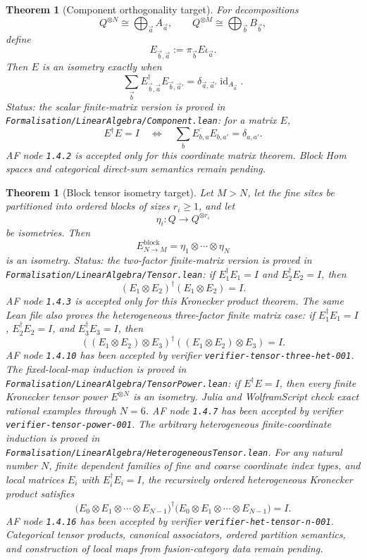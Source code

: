 \documentclass[11pt]{article}
\newtheorem{theorem}[definition]{Theorem}
\begin{document}
\begin{theorem}[Component orthogonality target]
For decompositions
\[
Q^{\otimes N}\cong \bigoplus_{\vec a}A_{\vec a},
\qquad
Q^{\otimes M}\cong \bigoplus_{\vec b}B_{\vec b},
\]
define
\[
E_{\vec b,\vec a}:=\pi_{\vec b}E\iota_{\vec a}.
\]
Then \(E\) is an isometry exactly when
\[
\sum_{\vec b}E_{\vec b,\vec a}^{\dagger}E_{\vec b,\vec a'}
=\delta_{\vec a,\vec a'}\operatorname{id}_{A_{\vec a}}.
\]
Status: the scalar finite-matrix version is proved in
\texttt{Formalisation/LinearAlgebra/Component.lean}: for a matrix \(E\),
\[
E^\dagger E=I
\quad\Longleftrightarrow\quad
\sum_b \overline{E_{b,a}}E_{b,a'}=\delta_{a,a'}.
\]
AF node \texttt{1.4.2} is accepted only for this coordinate matrix theorem.
Block Hom spaces and categorical direct-sum semantics remain pending.
\end{theorem}

\begin{theorem}[Block tensor isometry target]
Let \(M>N\), let the fine sites be partitioned into ordered blocks of sizes
\(r_i\geq 1\), and let
\[
\eta_i:Q\to Q^{\otimes r_i}
\]
be isometries. Then
\[
E_{N\to M}^{\mathrm{block}}=\eta_1\otimes\cdots\otimes\eta_N
\]
is an isometry. Status: the two-factor finite-matrix version is proved in
\texttt{Formalisation/LinearAlgebra/Tensor.lean}: if \(E_1^\dagger E_1=I\)
and \(E_2^\dagger E_2=I\), then
\[
(E_1\otimes E_2)^\dagger(E_1\otimes E_2)=I.
\]
AF node \texttt{1.4.3} is accepted only for this Kronecker product theorem.
The same Lean file also proves the heterogeneous three-factor finite matrix
case: if \(E_1^\dagger E_1=I\), \(E_2^\dagger E_2=I\), and
\(E_3^\dagger E_3=I\), then
\[
((E_1\otimes E_2)\otimes E_3)^\dagger
((E_1\otimes E_2)\otimes E_3)=I.
\]
AF node \texttt{1.4.10} has been accepted by verifier
\texttt{verifier-tensor-three-het-001}.
The fixed-local-map induction is proved in
\texttt{Formalisation/LinearAlgebra/TensorPower.lean}: if \(E^\dagger E=I\),
then every finite Kronecker tensor power \(E^{\otimes N}\) is an isometry.
Julia and WolframScript check exact rational examples through \(N=6\).
AF node \texttt{1.4.7} has been accepted by verifier
\texttt{verifier-tensor-power-001}.
The arbitrary heterogeneous finite-coordinate induction is proved in
\texttt{Formalisation/LinearAlgebra/HeterogeneousTensor.lean}. For any
natural number \(N\), finite dependent families of fine and coarse coordinate
index types, and local matrices \(E_i\) with \(E_i^\dagger E_i=I\), the
recursively ordered heterogeneous Kronecker product satisfies
\[
\bigl(E_0\otimes E_1\otimes\cdots\otimes E_{N-1}\bigr)^\dagger
\bigl(E_0\otimes E_1\otimes\cdots\otimes E_{N-1}\bigr)=I.
\]
AF node \texttt{1.4.16} has been accepted by verifier
\texttt{verifier-het-tensor-n-001}. Categorical tensor products, canonical
associators, ordered partition semantics, and construction of local maps from
fusion-category data remain pending.
\end{theorem}
\end{document}

